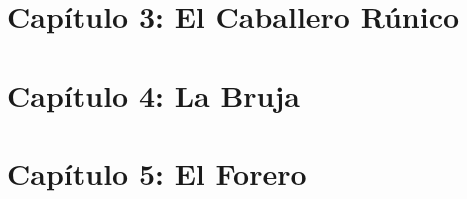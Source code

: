 \documentclass[
  letterpaper,
]{krantz}
\begin{document}

\hypertarget{capuxedtulo-3-el-caballero-ruxfanico}{%
\chapter{Capítulo 3: El Caballero
Rúnico}\label{capuxedtulo-3-el-caballero-ruxfanico}}


\hypertarget{capuxedtulo-4-la-bruja}{%
\chapter{Capítulo 4: La Bruja}\label{capuxedtulo-4-la-bruja}}


\hypertarget{capuxedtulo-5-el-forero}{%
\chapter{Capítulo 5: El Forero}\label{capuxedtulo-5-el-forero}}
\end{document}
